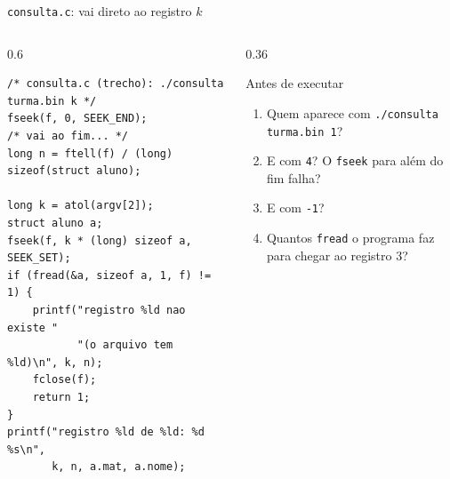\documentclass[aspectratio=169]{beamer}
\begin{document}
\begin{frame}[fragile]{\texttt{consulta.c}: vai direto ao registro $k$}
  \vspace{-0.6em}
  \begin{columns}[T]
    \begin{column}{0.6\textwidth}
\begin{lstlisting}[style=codCs]
/* consulta.c (trecho): ./consulta turma.bin k */
fseek(f, 0, SEEK_END);              /* vai ao fim... */
long n = ftell(f) / (long) sizeof(struct aluno);

long k = atol(argv[2]);
struct aluno a;
fseek(f, k * (long) sizeof a, SEEK_SET);
if (fread(&a, sizeof a, 1, f) != 1) {
    printf("registro %ld nao existe "
           "(o arquivo tem %ld)\n", k, n);
    fclose(f);
    return 1;
}
printf("registro %ld de %ld: %d %s\n",
       k, n, a.mat, a.nome);
\end{lstlisting}
    \end{column}
    \begin{column}{0.36\textwidth}
      \begin{block}{Antes de executar}
        \small
        \begin{enumerate}
          \item Quem aparece com \texttt{./consulta turma.bin 1}?
          \item E com \texttt{4}? O \texttt{fseek} para além do fim
            falha?
          \item E com \texttt{-1}?
          \item Quantos \texttt{fread} o programa faz para chegar ao
            registro 3?
        \end{enumerate}
      \end{block}
    \end{column}
  \end{columns}
\end{frame}
\end{document}
